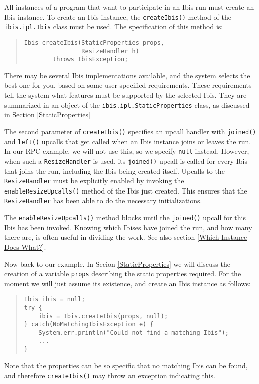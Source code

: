 \documentclass[10pt]{article}
\begin{document}
All instances of a program that want to participate in an Ibis run
must create an Ibis instance.
To create an Ibis instance, the \texttt{createIbis()} method of the
\texttt{ibis.ipl.Ibis} class must be used.
The specification of this method is:
\begin{quote}
\begin{verbatim}
Ibis createIbis(StaticProperties props,
                ResizeHandler h)
        throws IbisException;
\end{verbatim}
\end{quote}
There may be several Ibis implementations available, and
the system selects the best one for you, based on some
user-specified requirements.
These requirements tell the system what features must be supported
by the selected Ibis.
They are summarized in an object of the
\texttt{ibis.ipl.StaticProperties} class, as discussed in Section
\ref{StaticProperties}

The second parameter of \texttt{createIbis()} specifies an upcall handler
with \texttt{joined()} and \texttt{left()} upcalls that get called when an Ibis
instance joins or leaves the run.  In our RPC example, we will not use this, so we
specify \texttt{null} instead.  However, when such a \texttt{ResizeHandler}
is used, its \texttt{joined()} upcall is called for every Ibis that joins the
run, including the Ibis being created itself.
Upcalls to the \texttt{ResizeHandler} must be explicitly enabled by
invoking the \texttt{enableResizeUpcalls()} method of the Ibis
just created. This ensures that the \texttt{ResizeHandler} has been
able to do the necessary initializations.

The \texttt{enableResizeUpcalls()} method blocks until the
\texttt{joined()} upcall for this Ibis has been invoked.  Knowing which Ibises
have joined the run, and how many there are, is often useful in dividing
the work. See also section \ref{Which Instance Does What?}.

Now back to our example. In Secion \ref{StaticProperties} we will
discuss the creation of a variable \texttt{props} describing the
static properties required. For the moment we will just assume its
existence, and create an Ibis instance as follows:
\begin{quote}
\begin{verbatim}
Ibis ibis = null;
try {
    ibis = Ibis.createIbis(props, null);
} catch(NoMatchingIbisException e) {
    System.err.println("Could not find a matching Ibis");
    ...
}
\end{verbatim}
\end{quote}
Note that the properties can be so specific that no matching Ibis
can be found, and therefore \texttt{createIbis()} may throw an exception
indicating this.
\end{document}
